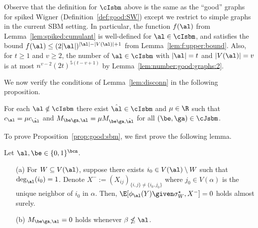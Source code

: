 \documentclass[11pt]{article}
\begin{document}
\begin{remark}\label{rmk:sbm}
Observe that the definition for $\cIsbm$ above is the same as the ``good'' graphs for spiked Wigner (Definition~\ref{def:good:SW}) except we restrict to simple graphs in the current SBM setting. In particular, the function $f(\al)$ from Lemma~\ref{lem:spiked:cumulant} is well-defined for $\al\in \cIsbm$, and satisfies the bound $f(\al)\leq (2|\al|)^{|\al|-|V(\al)|+1}$ from Lemma~\ref{lem:f:upper:bound}. Also, for $t \ge 1$ and $v \ge 2$, the number of $\al \in \cIsbm$ with $|\al|=t$ and $|V(\al)|=v$ is at most $n^{v-2}(2t)^{5(t-v+1)}$ by Lemma~\ref{lem:number:good:graphs:2}.
\end{remark}

We now verify the conditions of Lemma~\ref{lem:disconn} in the following proposition.
\begin{proposition}\label{prop:good:sbm}
For each $\al\notin \cIsbm$ there exist $\hat\al\in \cIsbm$ and $\mu \in \R$ such that $c_{\al}=\mu c_{\hat\al}$ and $M_{\be\ga,\al}=\mu M_{\be\ga,\hat\al}$ for all $(\be,\ga) \in \cJsbm$.
\end{proposition}

\noindent To prove Proposition~\ref{prop:good:sbm}, we first prove the following lemma.

\begin{lemma}\label{lem:sbm:simple}
Let $\al, \be\in \{0,1\}^{\bcn}$.
\begin{enumerate}
\item [(a)]For $W\subseteq V(\al)$, suppose there exists $i_0\in V(\al)\setminus W$ such that $\deg_{\al}(i_0)=1$. Denote $X^{-}:=(X_{ij})_{\{i,j\}\neq \{i_0,j_0\}}$ where $j_0\in V(\alpha)$ is the unique neighbor of $i_0$ in $\alpha$. Then, $\E[\phi_{\al}(Y)\given \sigma^\star_W, X^{-}]=0$ holds almost surely.
\item [(b)]$M_{\be\ga,\al}=0$ holds whenever $\beta \nleq \al$.
\end{enumerate}
\end{lemma}
\end{document}
